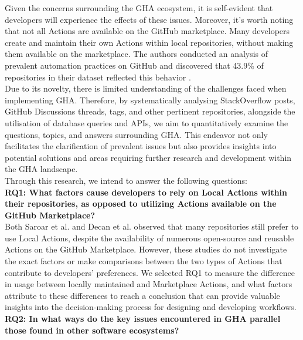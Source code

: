 \documentclass[conference]{IEEEtran}
\begin{document}
    Given the concerns surrounding the GHA ecosystem, it is self-evident that developers will experience the effects of these issues.  Moreover, it's worth noting that not all Actions are available on the GitHub marketplace. Many developers create and maintain their own Actions within local repositories, without making them available on the marketplace. The authors  conducted an analysis of prevalent automation practices on GitHub and discovered that 43.9\% of repositories in their dataset reflected this behavior \cite{decan2022use}.\\
    Due to its novelty, there is limited understanding of the challenges faced when implementing GHA.  
    Therefore,  by systematically analysing StackOverflow posts, GitHub Discussions threads, tags, and other pertinent repositories, alongside the utilisation of database queries and APIs, we aim to quantitatively examine the questions, topics, and answers surrounding GHA. This endeavor not only facilitates the clarification of prevalent issues but also provides insights into potential solutions and areas requiring further research and development within the GHA landscape.\\

    Through this research, we intend to answer the following questions:\\


    \textbf{RQ1: What factors cause developers to rely on Local Actions within their repositories, as opposed to utilizing Actions available on the GitHub Marketplace?}\\

    Both Saroar et al. \cite{saroar2023developers} and Decan et al. \cite{decan2022use} observed that many repositories still prefer to use Local Actions, despite the availability of numerous open-source and reusable Actions on the GitHub Marketplace. However, these studies do not investigate the exact factors or make comparisons between the two types of Actions that contribute to developers' preferences. We selected RQ1 to measure the difference in usage between locally maintained and Marketplace Actions, and what factors attribute to these differences to reach a conclusion that can provide valuable insights into the decision-making process for designing and developing workflows. \\

 \textbf{RQ2: In what ways do the key issues encountered in GHA parallel those found in other software ecosystems?}\\
\end{document}
